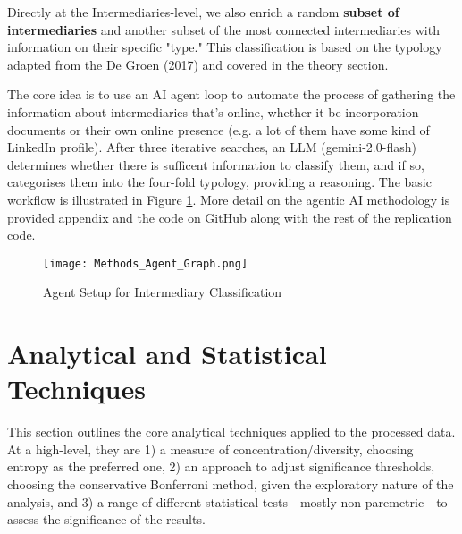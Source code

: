 Directly at the Intermediaries-level, we also enrich a random \textbf{subset of intermediaries} and another subset of the most connected intermediaries with information on their specific "type." This classification is based on the typology adapted from the De Groen (2017) and covered in the theory section. 

The core idea is to use an AI agent loop to automate the process of gathering the information about intermediaries that's online, whether it be incorporation documents or their own online presence (e.g. a lot of them have some kind of LinkedIn profile). After three iterative searches, an LLM (gemini-2.0-flash) determines whether there is sufficent information to classify them, and if so, categorises them into the four-fold typology, providing a reasoning. The basic workflow is illustrated in Figure \ref{fig:agent_loop_placeholder}. More detail on the agentic AI methodology is provided appendix and the code on GitHub along with the rest of the replication code.

\begin{figure}[htbp]
    \centering
    \texttt{[image: Methods\_Agent\_Graph.png]}
    \caption{Agent Setup for Intermediary Classification}
    \label{fig:agent_loop_placeholder}
\end{figure}

\section{Analytical and Statistical Techniques}
\label{sec:3_4}

This section outlines the core analytical techniques applied to the processed data. At a high-level, they are 1) a measure of concentration/diversity, choosing entropy as the preferred one, 2) an approach to adjust significance thresholds, choosing the conservative Bonferroni method, given the exploratory nature of the analysis, and 3) a range of different statistical tests - mostly non-paremetric - to assess the significance of the results.

